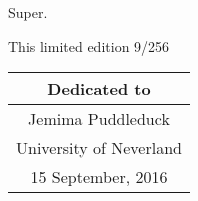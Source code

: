 
Super.

This limited edition 9/256

\begin{tabular}{||c||}
	\hline 
	Dedicated to \\ 
	\hline 
	Jemima Puddleduck \\ 
	\hline 
	University of Neverland \\ 
	\hline 
	15 September, 2016 \\ 
	\hline 
\end{tabular} 
